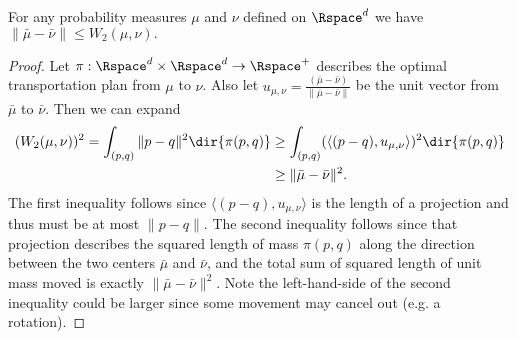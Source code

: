 \documentclass[11pt]{myclass}
\begin{document}
\begin{lemma}
For any probability measures $\mu$ and $\nu$ defined on $\Rspace^d$ we have
$\|\bar \mu - \bar \nu\| \leq W_2(\mu,\nu).$
\end{lemma}
\begin{proof}
Let $\pi : \Rspace^d \times \Rspace^d \to \Rspace^+$ describes the optimal transportation plan from $\mu$ to $\nu$.  Also let $u_{\mu,\nu} = \frac{(\bar \mu - \bar \nu)}{\|\bar \mu - \bar \nu \|}$ be the unit vector from $\bar \mu$ to $\bar \nu$.   Then we can expand 
\begin{align*}
(W_2(\mu,\nu))^2
= 
\int_{(p,q)} \|p-q\|^2 \dir{\pi(p,q)}
& \geq
\int_{(p,q)} (\langle (p-q), u_{\mu,\nu} \rangle)^2 \dir{\pi(p,q)}
\\ & \geq
\| \bar \mu - \bar \nu\|^2.
\end{align*}
The first inequality follows since $\langle (p-q), u_{\mu,\nu} \rangle$ is the length of a projection and thus must be at most $\|p-q\|$.  
The second inequality follows since that projection describes the squared length of mass $\pi(p,q)$ along the direction between the two centers $\bar \mu$ and $\bar \nu$, and the total sum of squared length of unit mass moved is exactly $\|\bar \mu - \bar \nu\|^2$.  Note the left-hand-side of the second inequality could be larger since some movement may cancel out (e.g. a rotation).  
\end{proof}
\end{document}
